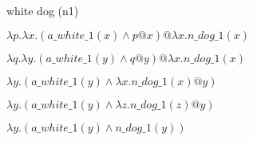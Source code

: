 \documentclass{article}
\begin{document}
\begin{description}[align=right, noitemsep]
\begin{description}[align=right, noitemsep]
\end{description}
\item [ad 3.] white dog (n1)
\begin{description}[align=right, noitemsep]
\item [apply] $\lambda p.\lambda x.(a\_white\_1(x) \wedge p@x)@\lambda x.n\_dog\_1(x)$
\item [alpha] $\lambda q.\lambda y.(a\_white\_1(y) \wedge q@y)@\lambda x.n\_dog\_1(x)$
\item [beta] $\lambda y.(a\_white\_1(y) \wedge \lambda x.n\_dog\_1(x)@y)$
\item [alpha] $\lambda y.(a\_white\_1(y) \wedge \lambda z.n\_dog\_1(z)@y)$
\item [beta] $\lambda y.(a\_white\_1(y) \wedge n\_dog\_1(y))$
\end{description}
\end{description}
\end{document}
